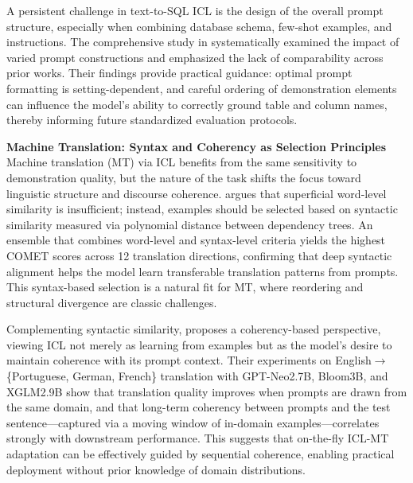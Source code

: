 \documentclass[11pt]{article}
\begin{document}
A persistent challenge in text-to-SQL ICL is the design of the overall prompt structure, especially when combining database schema, few-shot examples, and instructions. The comprehensive study in \cite{ref167} systematically examined the impact of varied prompt constructions and emphasized the lack of comparability across prior works. Their findings provide practical guidance: optimal prompt formatting is setting-dependent, and careful ordering of demonstration elements can influence the model's ability to correctly ground table and column names, thereby informing future standardized evaluation protocols.

\textbf{Machine Translation: Syntax and Coherency as Selection Principles}\\
Machine translation (MT) via ICL benefits from the same sensitivity to demonstration quality, but the nature of the task shifts the focus toward linguistic structure and discourse coherence. \cite{ref168} argues that superficial word-level similarity is insufficient; instead, examples should be selected based on syntactic similarity measured via polynomial distance between dependency trees. An ensemble that combines word-level and syntax-level criteria yields the highest COMET scores across 12 translation directions, confirming that deep syntactic alignment helps the model learn transferable translation patterns from prompts. This syntax-based selection is a natural fit for MT, where reordering and structural divergence are classic challenges.

Complementing syntactic similarity, \cite{ref169} proposes a coherency-based perspective, viewing ICL not merely as learning from examples but as the model's desire to maintain coherence with its prompt context. Their experiments on English\(\rightarrow\)\{Portuguese, German, French\} translation with GPT-Neo2.7B, Bloom3B, and XGLM2.9B show that translation quality improves when prompts are drawn from the same domain, and that long-term coherency between prompts and the test sentence---captured via a moving window of in-domain examples---correlates strongly with downstream performance. This suggests that on-the-fly ICL-MT adaptation can be effectively guided by sequential coherence, enabling practical deployment without prior knowledge of domain distributions.
\end{document}
